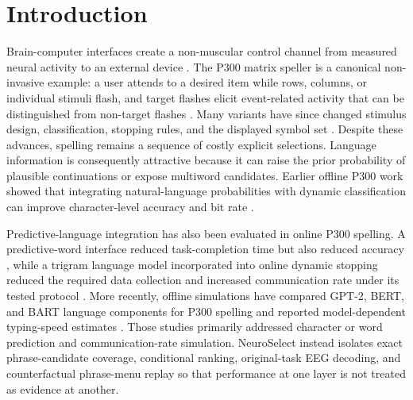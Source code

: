\documentclass[11pt]{article}
\begin{document}
\begin{abstract}
\textbf{Conclusions:} NeuroSelect provides a checksum-addressed way to study language-assisted P300 candidate selection without merging unlike evidence tiers. The experiments identify candidate coverage, especially message openings and unseen surface families, as the largest observed bottleneck in the evaluated pipeline. They do not demonstrate live communication benefit, clinical efficacy, or open-vocabulary thought decoding.


\textbf{Keywords:} brain-computer interface; P300; language prediction; personalization; candidate generation; counterfactual replay; reproducible research.


\end{abstract}

\section{Introduction}

Brain-computer interfaces create a non-muscular control channel from measured neural activity to an external device \cite{wolpaw2002}. The P300 matrix speller is a canonical non-invasive example: a user attends to a desired item while rows, columns, or individual stimuli flash, and target flashes elicit event-related activity that can be distinguished from non-target flashes \cite{farwell1988}. Many variants have since changed stimulus design, classification, stopping rules, and the displayed symbol set \cite{rezeika2018,pan2022}. Despite these advances, spelling remains a sequence of costly explicit selections. Language information is consequently attractive because it can raise the prior probability of plausible continuations or expose multiword candidates. Earlier offline P300 work showed that integrating natural-language probabilities with dynamic classification can improve character-level accuracy and bit rate \cite{speier2012}.


Predictive-language integration has also been evaluated in online P300 spelling. A predictive-word interface reduced task-completion time but also reduced accuracy \cite{ryan2011}, while a trigram language model incorporated into online dynamic stopping reduced the required data collection and increased communication rate under its tested protocol \cite{mainsah2014}. More recently, offline simulations have compared GPT-2, BERT, and BART language components for P300 spelling and reported model-dependent typing-speed estimates \cite{parthasarathy2024}. Those studies primarily addressed character or word prediction and communication-rate simulation. NeuroSelect instead isolates exact phrase-candidate coverage, conditional ranking, original-task EEG decoding, and counterfactual phrase-menu replay so that performance at one layer is not treated as evidence at another.
\end{document}
